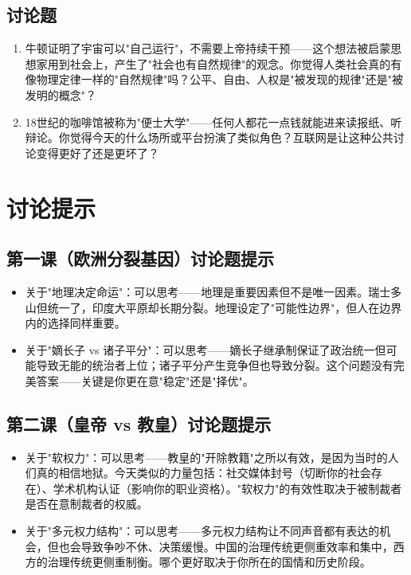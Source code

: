 \documentclass[a4paper,12pt]{ctexart}
\begin{document}
\subsection*{讨论题}
\begin{enumerate}
  \item 牛顿证明了宇宙可以"自己运行"，不需要上帝持续干预——这个想法被启蒙思想家用到社会上，产生了"社会也有自然规律"的观念。你觉得人类社会真的有像物理定律一样的"自然规律"吗？公平、自由、人权是"被发现的规律"还是"被发明的概念"？
  \item 18世纪的咖啡馆被称为"便士大学"——任何人都花一点钱就能进来读报纸、听辩论。你觉得今天的什么场所或平台扮演了类似角色？互联网是让这种公共讨论变得更好了还是更坏了？
\end{enumerate}

\section*{讨论提示}

\subsection*{第一课（欧洲分裂基因）讨论题提示}
\begin{itemize}
  \item 关于"地理决定命运"：可以思考——地理是重要因素但不是唯一因素。瑞士多山但统一了，印度大平原却长期分裂。地理设定了"可能性边界"，但人在边界内的选择同样重要。
  \item 关于"嫡长子 vs 诸子平分"：可以思考——嫡长子继承制保证了政治统一但可能导致无能的统治者上位；诸子平分产生竞争但也导致分裂。这个问题没有完美答案——关键是你更在意"稳定"还是"择优"。
\end{itemize}

\subsection*{第二课（皇帝 vs 教皇）讨论题提示}
\begin{itemize}
  \item 关于"软权力"：可以思考——教皇的"开除教籍"之所以有效，是因为当时的人们真的相信地狱。今天类似的力量包括：社交媒体封号（切断你的社会存在）、学术机构认证（影响你的职业资格）。"软权力"的有效性取决于被制裁者是否在意制裁者的权威。
  \item 关于"多元权力结构"：可以思考——多元权力结构让不同声音都有表达的机会，但也会导致争吵不休、决策缓慢。中国的治理传统更侧重效率和集中，西方的治理传统更侧重制衡。哪个更好取决于你所在的国情和历史阶段。
\end{itemize}
\end{document}
